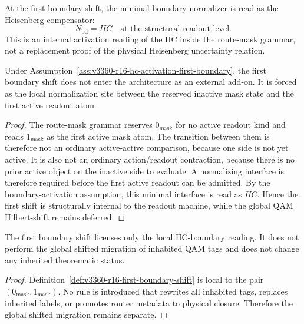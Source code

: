 \begin{assumption}
\label{ass:v3360-r16-hc-activation-first-boundary}
At the first boundary shift, the minimal boundary normalizer is read as the
Heisenberg compensator:
\[
 N_{\mathrm{bd}} = HC
 \quad\text{at the structural readout level.}
\]
This is an internal activation reading of the HC inside the route-mask grammar,
not a replacement proof of the physical Heisenberg uncertainty relation.
\end{assumption}

\begin{proposition}
\label{prop:v3360-r16-internal-origin-first-hc-shift}
Under Assumption~\ref{ass:v3360-r16-hc-activation-first-boundary}, the first
boundary shift does not enter the  architecture as an external add-on.
It is forced as the local normalization site between the reserved inactive mask
state and the first active readout atom.
\end{proposition}

\begin{proof}
The route-mask grammar reserves $0_{\mathrm{mask}}$ for no active readout kind
and reads $1_{\mathrm{mask}}$ as the first active mask atom. The transition
between them is therefore not an ordinary active-active comparison, because one
side is not yet active. It is also not an ordinary action/readout contraction,
because there is no prior active object on the inactive side to evaluate. A
normalizing interface is therefore required before the first active readout can
be admitted. By the boundary-activation assumption, this minimal interface is
read as $HC$. Hence the first shift is structurally internal to the readout
machine, while the global QAM Hilbert-shift remains deferred.
\end{proof}

\begin{corollary}
\label{cor:v3360-r16-no-shifted-migration-from-first-shift}
The first boundary shift licenses only the local HC-boundary reading. It does
not perform the global shifted migration of inhabited QAM tags and does not change
any inherited theorematic status.
\end{corollary}

\begin{proof}
Definition~\ref{def:v3360-r16-first-boundary-shift} is local to the pair
$(0_{\mathrm{mask}},1_{\mathrm{mask}})$. No rule is introduced that rewrites
all inhabited tags, replaces inherited labels, or promotes router metadata to
physical closure. Therefore the global shifted migration remains separate.
\end{proof}

